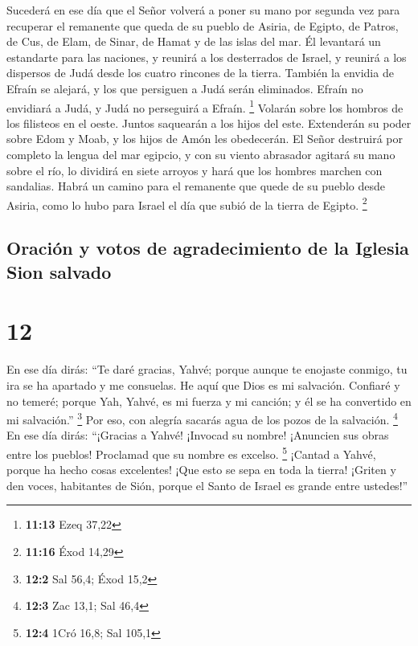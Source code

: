  Sucederá en ese día que el Señor volverá a poner su mano
por segunda vez para recuperar el remanente que queda de su pueblo de
Asiria, de Egipto, de Patros, de Cus, de Elam, de Sinar, de Hamat y de
las islas del mar.  Él levantará un estandarte para las
naciones, y reunirá a los desterrados de Israel, y reunirá a los
dispersos de Judá desde los cuatro rincones de la tierra.
 También la envidia de Efraín se alejará, y los que
persiguen a Judá serán eliminados. Efraín no envidiará a Judá, y Judá no
perseguirá a Efraín. \footnote{\textbf{11:13} Ezeq 37,22}
 Volarán sobre los hombros de los filisteos en el oeste.
Juntos saquearán a los hijos del este. Extenderán su poder sobre Edom y
Moab, y los hijos de Amón les obedecerán.  El Señor
destruirá por completo la lengua del mar egipcio, y con su viento
abrasador agitará su mano sobre el río, lo dividirá en siete arroyos y
hará que los hombres marchen con sandalias.  Habrá un
camino para el remanente que quede de su pueblo desde Asiria, como lo
hubo para Israel el día que subió de la tierra de Egipto. \footnote{\textbf{11:16}
  Éxod 14,29}

\hypertarget{oraciuxf3n-y-votos-de-agradecimiento-de-la-iglesia-sion-salvado}{%
\subsection{Oración y votos de agradecimiento de la Iglesia Sion
salvado}\label{oraciuxf3n-y-votos-de-agradecimiento-de-la-iglesia-sion-salvado}}

\hypertarget{section-11}{%
\section{12}\label{section-11}}

 En ese día dirás: ``Te daré gracias, Yahvé; porque aunque
te enojaste conmigo, tu ira se ha apartado y me consuelas.
 He aquí que Dios es mi salvación. Confiaré y no temeré;
porque Yah, Yahvé, es mi fuerza y mi canción; y él se ha convertido en
mi salvación.'' \footnote{\textbf{12:2} Sal 56,4; Éxod 15,2}
 Por eso, con alegría sacarás agua de los pozos de la
salvación. \footnote{\textbf{12:3} Zac 13,1; Sal 46,4}  En
ese día dirás: ``¡Gracias a Yahvé! ¡Invocad su nombre! ¡Anuncien sus
obras entre los pueblos! Proclamad que su nombre es excelso. \footnote{\textbf{12:4}
  1Cró 16,8; Sal 105,1}  ¡Cantad a Yahvé, porque ha hecho
cosas excelentes! ¡Que esto se sepa en toda la tierra! 
¡Griten y den voces, habitantes de Sión, porque el Santo de Israel es
grande entre ustedes!''


